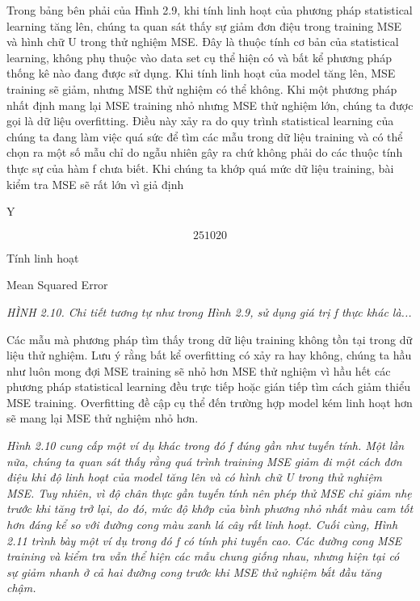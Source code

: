 Trong bảng bên phải của Hình 2.9, khi tính linh hoạt của phương pháp statistical learning tăng lên, chúng ta quan sát thấy sự giảm đơn điệu trong training MSE và hình chữ U trong thử nghiệm MSE. Đây là thuộc tính cơ bản của statistical learning, không phụ thuộc vào data set cụ thể hiện có và bất kể phương pháp thống kê nào đang được sử dụng. Khi tính linh hoạt của model tăng lên, MSE training sẽ giảm, nhưng MSE thử nghiệm có thể không. Khi một phương pháp nhất định mang lại MSE training nhỏ nhưng MSE thử nghiệm lớn, chúng ta được gọi là dữ liệu overfitting. Điều này xảy ra do quy trình statistical learning của chúng ta đang làm việc quá sức để tìm các mẫu trong dữ liệu training và có thể chọn ra một số mẫu chỉ do ngẫu nhiên gây ra chứ không phải do các thuộc tính thực sự của hàm f chưa biết. Khi chúng ta khớp quá mức dữ liệu training, bài kiểm tra MSE sẽ rất lớn vì giả định

Y

\[2 5 10 20\]

Tính linh hoạt

Mean Squared Error

\noindent\textit{HÌNH 2.10. Chi tiết tương tự như trong Hình 2.9, sử dụng giá trị f thực khác là...}

Các mẫu mà phương pháp tìm thấy trong dữ liệu training không tồn tại trong dữ liệu thử nghiệm. Lưu ý rằng bất kể overfitting có xảy ra hay không, chúng ta hầu như luôn mong đợi MSE training sẽ nhỏ hơn MSE thử nghiệm vì hầu hết các phương pháp statistical learning đều trực tiếp hoặc gián tiếp tìm cách giảm thiểu MSE training. Overfitting đề cập cụ thể đến trường hợp model kém linh hoạt hơn sẽ mang lại MSE thử nghiệm nhỏ hơn.

\noindent\textit{Hình 2.10 cung cấp một ví dụ khác trong đó f đúng gần như tuyến tính. Một lần nữa, chúng ta quan sát thấy rằng quá trình training MSE giảm đi một cách đơn điệu khi độ linh hoạt của model tăng lên và có hình chữ U trong thử nghiệm MSE. Tuy nhiên, vì độ chân thực gần tuyến tính nên phép thử MSE chỉ giảm nhẹ trước khi tăng trở lại, do đó, mức độ khớp của bình phương nhỏ nhất màu cam tốt hơn đáng kể so với đường cong màu xanh lá cây rất linh hoạt. Cuối cùng, Hình 2.11 trình bày một ví dụ trong đó f có tính phi tuyến cao. Các đường cong MSE training và kiểm tra vẫn thể hiện các mẫu chung giống nhau, nhưng hiện tại có sự giảm nhanh ở cả hai đường cong trước khi MSE thử nghiệm bắt đầu tăng chậm.}

